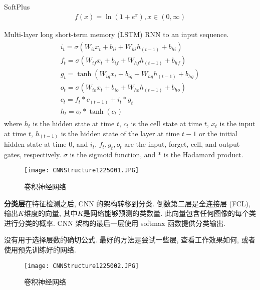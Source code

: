 SoftPlus \cite{glorot2011}
\begin{align}
  f(x)=\ln \left(1+e^{x}\right), x\in (0, \infty)
\end{align}

Multi-layer long short-term memory (LSTM) RNN to an input sequence.
\begin{align}
\begin{array}{l}
{i_{t}=\sigma\left(W_{i i} x_{t}+b_{i i}+W_{h i} h_{(t-1)}+b_{h i}\right)} \\
{f_{t}=\sigma\left(W_{i f} x_{t}+b_{i f}+W_{h f} h_{(t-1)}+b_{h f}\right)} \\
{g_{t}=\tanh \left(W_{i g} x_{t}+b_{i g}+W_{h g} h_{(t-1)}+b_{h g}\right)} \\
{o_{t}=\sigma\left(W_{i o} x_{t}+b_{i o}+W_{h o} h_{(t-1)}+b_{h o}\right)} \\
{c_{t}=f_{t} * c_{(t-1)}+i_{t} * g_{t}} \\
{h_{t}=o_{t} * \tanh \left(c_{t}\right)}
\end{array}
\end{align}
where $h_t$ is the hidden state at time $t$, $c_t$ is the cell state at time $t$, $x_t$ is the input at time $t$, $h_{(t-1)}$ is the hidden state of the layer at time $t-1$ or the initial hidden state at time 0,
and $i_t$, $f_t, g_t, o_t$ are the input, forget, cell, and output gates, respectively. $\sigma$ is the sigmoid function, and $*$ is the Hadamard product.
\begin{figure}[H]
\centering
\texttt{[image: CNNStructure1225001.JPG]}
\caption{卷积神经网络}
\label{CNNStructure1225001}
\vspace{-0.4cm}
\end{figure}

\textbf{分类层}在特征检测之后, CNN 的架构转移到分类. 倒数第二层是全连接层 (FCL), 输出$K$维度的向量, 其中$K$是网络能够预测的类数量. 此向量包含任何图像的每个类进行分类的概率. CNN 架构的最后一层使用 softmax 函数提供分类输出.

没有用于选择层数的确切公式. 最好的方法是尝试一些层, 查看工作效果如何, 或者使用预先训练好的网络.
\begin{figure}[H]
\centering
\texttt{[image: CNNStructure1225002.JPG]}
\caption{卷积神经网络}
\label{CNNStructure1225002}
\vspace{-0.4cm}
\end{figure}

